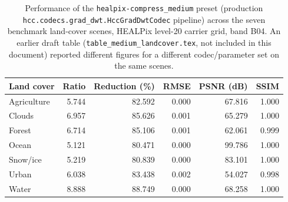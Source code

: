 \begin{table}[t]
\centering
\caption{Performance of the \texttt{healpix-compress\_medium} preset (production \texttt{hcc.codecs.grad\_dwt.HccGradDwtCodec} pipeline) across the seven benchmark land-cover scenes, HEALPix level-20 carrier grid, band B04. An earlier draft table (\texttt{table\_medium\_landcover.tex}, not included in this document) reported different figures for a different codec/parameter set on the same scenes.}
\label{tab:medium_by_scene_dwt}
\begin{tabular}{@{}lrrrrr@{}}
\toprule
Land cover & Ratio & Reduction (\%) & RMSE & PSNR (dB) & SSIM \\
\midrule
Agriculture & 5.744 & 82.592 & 0.000 & 67.816  & 1.000 \\
Clouds      & 6.957 & 85.626 & 0.001 & 65.279  & 1.000 \\
Forest      & 6.714 & 85.106 & 0.001 & 62.061  & 0.999 \\
Ocean       & 5.121 & 80.471 & 0.000 & 99.786  & 1.000 \\
Snow/ice    & 5.219 & 80.839 & 0.000 & 83.101  & 1.000 \\
Urban       & 6.038 & 83.438 & 0.002 & 54.027  & 0.998 \\
Water       & 8.888 & 88.749 & 0.000 & 68.258  & 1.000 \\
\bottomrule
\end{tabular}
\end{table}
